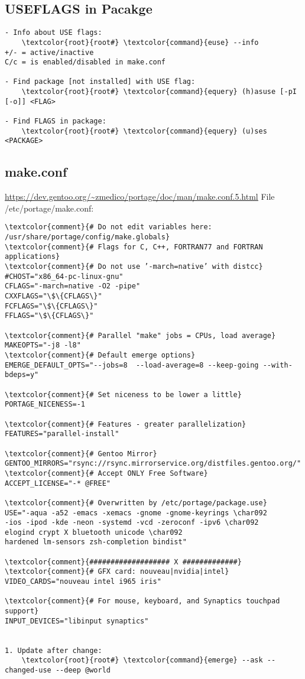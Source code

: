 \documentclass[10pt, a4paper, onecolumn, openany]{book}         %
\begin{document}
\subsection{USEFLAGS in Pacakge}
\begin{Verbatim}[commandchars=\\\{\}]
- Info about USE flags:
    \textcolor{root}{root#} \textcolor{command}{euse} --info
+/- = active/inactive
C/c = is enabled/disabled in make.conf

- Find package [not installed] with USE flag:
    \textcolor{root}{root#} \textcolor{command}{equery} (h)asuse [-pI [-o]] <FLAG>
    
- Find FLAGS in package:
    \textcolor{root}{root#} \textcolor{command}{equery} (u)ses <PACKAGE>
\end{Verbatim}


\subsection{make.conf}
\label{make.conf}
\underline{\url{https://dev.gentoo.org/~zmedico/portage/doc/man/make.conf.5.html}}\newline
File \textcolor{file}{/etc/portage/make.conf}:
\begin{Verbatim}[commandchars=\\\{\}]
\textcolor{comment}{# Do not edit variables here: /usr/share/portage/config/make.globals}
\textcolor{comment}{# Flags for C, C++, FORTRAN77 and FORTRAN applications}
\textcolor{comment}{# Do not use ’-march=native’ with distcc}
#CHOST="x86_64-pc-linux-gnu"
CFLAGS="-march=native -O2 -pipe"
CXXFLAGS="\$\{CFLAGS\}"
FCFLAGS="\$\{CFLAGS\}"
FFLAGS="\$\{CFLAGS\}"

\textcolor{comment}{# Parallel "make" jobs = CPUs, load average}
MAKEOPTS="-j8 -l8" 
\textcolor{comment}{# Default emerge options}
EMERGE_DEFAULT_OPTS="--jobs=8  --load-average=8 --keep-going --with-bdeps=y"

\textcolor{comment}{# Set niceness to be lower a little}
PORTAGE_NICENESS=-1

\textcolor{comment}{# Features - greater parallelization}
FEATURES="parallel-install"

\textcolor{comment}{# Gentoo Mirror}
GENTOO_MIRRORS="rsync://rsync.mirrorservice.org/distfiles.gentoo.org/"
\textcolor{comment}{# Accept ONLY Free Software}
ACCEPT_LICENSE="-* @FREE"

\textcolor{comment}{# Overwritten by /etc/portage/package.use}
USE="-aqua -a52 -emacs -xemacs -gnome -gnome-keyrings \char092
-ios -ipod -kde -neon -systemd -vcd -zeroconf -ipv6 \char092
elogind crypt X bluetooth unicode \char092
hardened lm-sensors zsh-completion bindist"

\textcolor{comment}{################### X #############}
\textcolor{comment}{# GFX card: nouveau|nvidia|intel}
VIDEO_CARDS="nouveau intel i965 iris"

\textcolor{comment}{# For mouse, keyboard, and Synaptics touchpad support}
INPUT_DEVICES="libinput synaptics"


1. Update after change:
    \textcolor{root}{root#} \textcolor{command}{emerge} --ask --changed-use --deep @world
\end{Verbatim}
\end{document}
